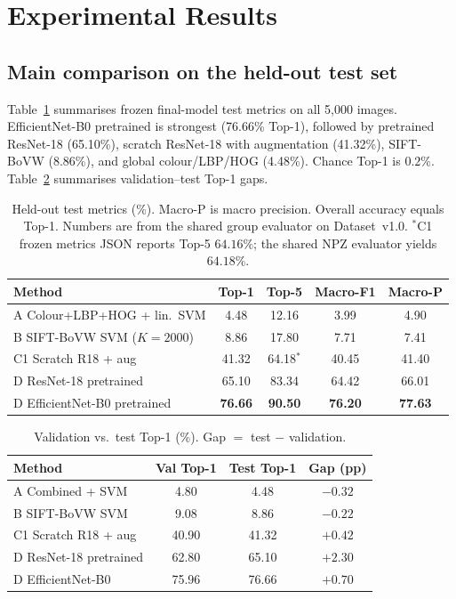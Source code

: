 \documentclass[10pt,twocolumn,letterpaper]{article}
\begin{document}
\section{Experimental Results}

\subsection{Main comparison on the held-out test set}

Table~\ref{tab:main} summarises frozen final-model test metrics on all 5{,}000
images. EfficientNet-B0 pretrained is strongest (76.66\% Top-1), followed by
pretrained ResNet-18 (65.10\%), scratch ResNet-18 with augmentation (41.32\%),
SIFT-BoVW (8.86\%), and global colour/LBP/HOG (4.48\%). Chance Top-1 is
$0.2\%$. Table~\ref{tab:gaps} summarises validation--test Top-1 gaps.

\begin{table}[t]
\centering
\footnotesize
\setlength{\tabcolsep}{3.5pt}
\begin{tabular}{@{}lcccc@{}}
\toprule
Method & Top-1 & Top-5 & Macro-F1 & Macro-P \\
\midrule
A Colour+LBP+HOG + lin.\ SVM & 4.48 & 12.16 & 3.99 & 4.90 \\
B SIFT-BoVW SVM ($K{=}2000$) & 8.86 & 17.80 & 7.71 & 7.41 \\
C1 Scratch R18 + aug & 41.32 & 64.18$^\ast$ & 40.45 & 41.40 \\
D ResNet-18 pretrained & 65.10 & 83.34 & 64.42 & 66.01 \\
D EfficientNet-B0 pretrained & \textbf{76.66} & \textbf{90.50} & \textbf{76.20} & \textbf{77.63} \\
\bottomrule
\end{tabular}
\caption{Held-out test metrics (\%). Macro-P is macro precision. Overall
accuracy equals Top-1. Numbers are from the shared group evaluator on
Dataset~v1.0. $^\ast$C1 frozen metrics JSON reports Top-5 $64.16\%$; the
shared NPZ evaluator yields $64.18\%$.}
\label{tab:main}
\end{table}

\begin{table}[t]
\centering
\footnotesize
\setlength{\tabcolsep}{3pt}
\begin{tabular}{@{}lccc@{}}
\toprule
Method & Val Top-1 & Test Top-1 & Gap (pp) \\
\midrule
A Combined + SVM & 4.80 & 4.48 & $-0.32$ \\
B SIFT-BoVW SVM & 9.08 & 8.86 & $-0.22$ \\
C1 Scratch R18 + aug & 40.90 & 41.32 & $+0.42$ \\
D ResNet-18 pretrained & 62.80 & 65.10 & $+2.30$ \\
D EfficientNet-B0 & 75.96 & 76.66 & $+0.70$ \\
\bottomrule
\end{tabular}
\caption{Validation vs.\ test Top-1 (\%). Gap $=$ test $-$ validation.}
\label{tab:gaps}
\end{table}
\end{document}
